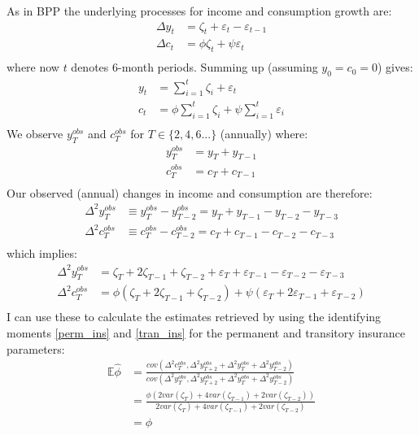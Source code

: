 \documentclass[titlepage]{\econtex}\newcommand{\texname}{BPP_PSID_TimeAgg}
\begin{document}
As in BPP the underlying processes for income and consumption growth are:
\begin{align*}
\Delta y_t & = \zeta_t + \varepsilon_t - \varepsilon_{t-1} \\
\Delta c_t & = \phi \zeta_t + \psi \varepsilon_t  \\
\end{align*}
where now $t$ denotes 6-month periods. Summing up (assuming $y_0=c_0=0$) gives:
\begin{align*}
y_t & = \sum_{i=1}^t \zeta_i + \varepsilon_t  \\
c_t & = \phi \sum_{i=1}^t \zeta_i + \psi \sum_{i=1}^t \varepsilon_i  \\
\end{align*}
We observe $y^{obs}_T$ and $c^{obs}_T$ for $T \in \{2,4,6...\}$ (annually) where:
\begin{align*}
y^{obs}_T & = y_T + y_{T-1}  \\
c^{obs}_T & = c_T + c_{T-1}  \\
\end{align*}
Our observed (annual) changes in income and consumption are therefore:
\begin{align*}
\Delta^2 y^{obs}_T & \equiv y^{obs}_T-y^{obs}_{T-2} =  y_T + y_{T-1} - y_{T-2} - y_{T-3} \\
\Delta^2 c^{obs}_T & \equiv c^{obs}_T-c^{obs}_{T-2} =  c_T + c_{T-1} - c_{T-2} - c_{T-3}  \\
\end{align*}
which implies:
\begin{align*}
\Delta^2 y^{obs}_T & = \zeta_T + 2\zeta_{T-1} +\zeta_{T-2} + \varepsilon_T + \varepsilon_{T-1} - \varepsilon_{T-2} - \varepsilon_{T-3} \\
\Delta^2 c^{obs}_T & =  \phi(\zeta_T + 2\zeta_{T-1} +\zeta_{T-2}) + \psi(\varepsilon_T + 2\varepsilon_{T-1} + \varepsilon_{T-2} ) \\
\end{align*}
I can use these to calculate the estimates retrieved by using the identifying moments \ref{perm_ins} and \ref{tran_ins} for the permanent and transitory insurance parameters:
\begin{align}
\mathbb{E} \hat{\phi} &= \frac{cov(\Delta^2 c^{obs}_T,\Delta^2 y^{obs}_{T+2}+\Delta^2 y^{obs}_{T}+\Delta^2 y^{obs}_{T-2})}{cov(\Delta^2 y^{obs}_T,\Delta^2 y^{obs}_{T+2}+\Delta^2 y^{obs}_{T}+\Delta^2 y^{obs}_{T-2})} \nonumber \\
&= \frac{\phi (2var(\zeta_T) + 4var(\zeta_{T-1}) + 2var(\zeta_{T-2})) }{2var(\zeta_T) + 4var(\zeta_{T-1}) + 2var(\zeta_{T-2})  } \nonumber\\
& = \phi	\label{phihat}
\end{align}
\end{document}
